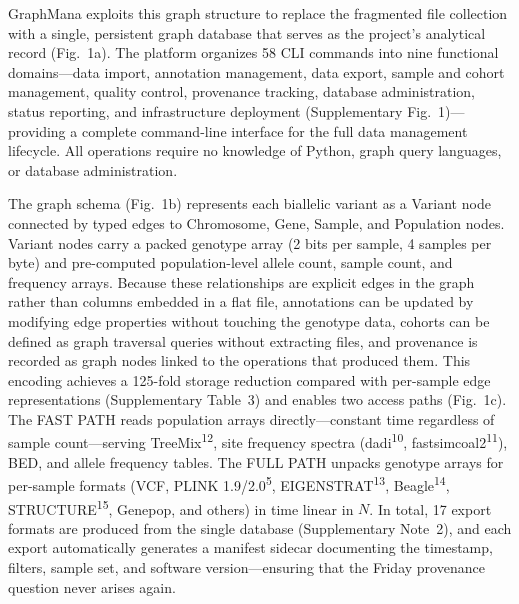 \documentclass[11pt,a4paper]{article}
\newcommand{\citenum}[1]{\textsuperscript{#1}}
\begin{document}
GraphMana exploits this graph structure to replace the fragmented file collection with a single, persistent graph database that serves as the project's analytical record (Fig.~1a). The platform organizes 58 CLI commands into nine functional domains---data import, annotation management, data export, sample and cohort management, quality control, provenance tracking, database administration, status reporting, and infrastructure deployment (Supplementary Fig.~1)---providing a complete command-line interface for the full data management lifecycle. All operations require no knowledge of Python, graph query languages, or database administration.

The graph schema (Fig.~1b) represents each biallelic variant as a Variant node connected by typed edges to Chromosome, Gene, Sample, and Population nodes. Variant nodes carry a packed genotype array (2 bits per sample, 4 samples per byte) and pre-computed population-level allele count, sample count, and frequency arrays. Because these relationships are explicit edges in the graph rather than columns embedded in a flat file, annotations can be updated by modifying edge properties without touching the genotype data, cohorts can be defined as graph traversal queries without extracting files, and provenance is recorded as graph nodes linked to the operations that produced them. This encoding achieves a 125-fold storage reduction compared with per-sample edge representations (Supplementary Table~3) and enables two access paths (Fig.~1c). The FAST PATH reads population arrays directly---constant time regardless of sample count---serving TreeMix\citenum{12}, site frequency spectra (dadi\citenum{10}, fastsimcoal2\citenum{11}), BED, and allele frequency tables. The FULL PATH unpacks genotype arrays for per-sample formats (VCF, PLINK 1.9/2.0\citenum{5}, EIGENSTRAT\citenum{13}, Beagle\citenum{14}, STRUCTURE\citenum{15}, Genepop, and others) in time linear in $N$. In total, 17 export formats are produced from the single database (Supplementary Note~2), and each export automatically generates a manifest sidecar documenting the timestamp, filters, sample set, and software version---ensuring that the Friday provenance question never arises again.
\end{document}
